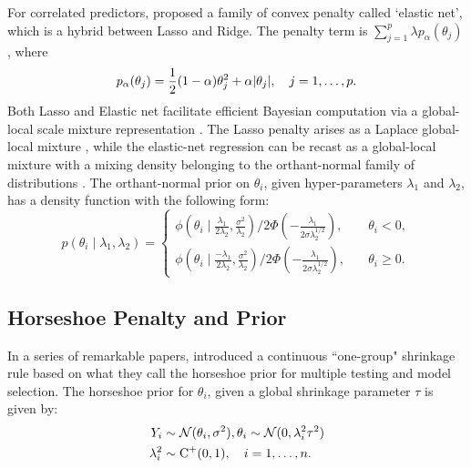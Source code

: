 \documentclass[11pt]{article}
\begin{document}
For correlated predictors, \cite{zou2005regularization} proposed a family of convex penalty called `elastic net', which is a hybrid between Lasso and Ridge. The penalty term is $\sum_{j=1}^{p} \lambda p_{\alpha}(\theta_j)$, where 
\[
p_{\alpha}(\theta_j) = \frac{1}{2} (1-\alpha)\theta_j^2 + \alpha \lvert\theta_j\rvert, \quad j = 1, \ldots, p. 
\]
Both Lasso and Elastic net facilitate efficient Bayesian computation via a global-local scale mixture representation \cite{bhadra2016global}. The Lasso penalty arises as a Laplace global-local mixture \citep{andrews1974scale}, while the elastic-net regression can be recast as a global-local mixture with a mixing density belonging to the orthant-normal family of distributions \citep{hans2011elastic}.  The orthant-normal prior on $\theta_i$, given hyper-parameters $\lambda_1$ and $\lambda_2$, 
has a density function with the following form:
\begin{equation}
  p(\theta_i \mid \lambda_1, \lambda_2)  = 
  \begin{cases} 
   \phi(\theta_i \mid \frac{\lambda_1}{2\lambda_2}, \frac{\sigma^2}{\lambda_2}) / 2\Phi\left(-\frac{\lambda_1}{2\sigma \lambda_2^{1/2} }\right), & \quad \theta_i < 0, \\
   \phi(\theta_i \mid \frac{-\lambda_1}{2\lambda_2}, \frac{\sigma^2}{\lambda_2}) / 2\Phi\left(-\frac{\lambda_1}{2\sigma \lambda_2^{1/2} }\right), & \quad \theta_i \geq 0. \end{cases} 
  \label{eq:hans}
\end{equation}
 

\subsection{Horseshoe Penalty and Prior}\label{sec:one-gp}


In a series of remarkable papers, \citet*{carvalho2009handling, carvalho2010horseshoe, polson2010shrink, polson2012half} introduced a continuous ``one-group" shrinkage rule based on what they call the horseshoe prior for multiple testing and model selection. The horseshoe prior for $\theta_i$, given a global shrinkage parameter $\tau$ is given by: 
\begin{align}
Y_i & \sim {\cal N}(\theta_i , \sigma^2), \theta_i \sim {\cal N}(0, \lambda_i^2 \tau^2) \nonumber \\
\lambda_i ^2 & \sim \operatorname{C}^{+}(0,1), \quad i = 1, \ldots, n. \label{eq:hs}
\end{align}
\end{document}
